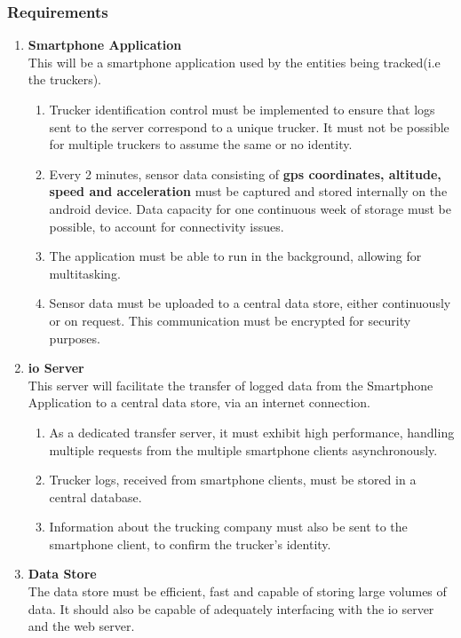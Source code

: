 \subsubsection{Requirements}
\begin{enumerate}
\item \textbf{Smartphone Application}\\
    This will be a smartphone application used by the entities being tracked(i.e the truckers).
    \begin{enumerate}
        \item Trucker identification control must be implemented to ensure that logs sent to the server correspond to a unique trucker. It must not be possible for multiple truckers to assume the same or no identity.
        \item Every 2 minutes, sensor data consisting of \textbf{\ac{gps} coordinates, altitude, speed and acceleration} must be captured and stored internally on the android device. 
        Data capacity for one continuous week of storage must be possible, to account for connectivity issues.
        \item The application must be able to run in the background, allowing for multitasking.
        \item Sensor data must be uploaded to a central data store, either continuously or on request. This communication must be encrypted for security purposes.
    \end{enumerate}
\item \textbf{\ac{io} Server}\\
This server will facilitate the transfer of logged data from the Smartphone Application to a central data store, via an internet connection. 
    \begin{enumerate}
        \item As a dedicated transfer server, it must exhibit high performance, handling multiple requests from the multiple smartphone clients asynchronously.
        \item Trucker logs, received from smartphone clients, must be stored in a central database.
        \item Information about the trucking company must also be sent to the smartphone client, to confirm the trucker's identity.
    \end{enumerate}

\item \textbf{Data Store}\\
The data store must be efficient, fast and capable of storing large volumes of data.
It should also be capable of adequately interfacing with the \ac{io} server and the web server.


\end{enumerate}
